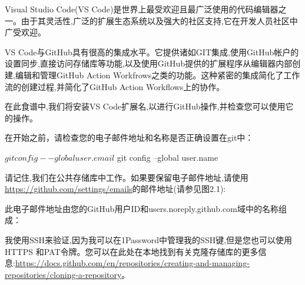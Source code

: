 
Visual Studio Code(VS Code)是世界上最受欢迎且最广泛使用的代码编辑器之一。由于其灵活性,广泛的扩展生态系统以及强大的社区支持,它在开发人员社区中广受欢迎。

VS Code与GitHub具有很高的集成水平。它提供诸如GIT集成,使用GitHub帐户的设置同步,直接访问存储库等功能,以及使用GitHub提供的扩展程序从编辑器内部创建,编辑和管理GitHub Action Workfrows之类的功能。这种紧密的集成简化了工作流的创建过程,并简化了GitHub Action Workflows上的协作。

在此食谱中,我们将安装VS Code扩展名,以进行GitHub操作,并检查您可以使用它的操作。


在开始之前，请检查您的电子邮件地址和名称是否正确设置在git中：

\begin{shell}
$ git config --global user.email
$ git config --global user.name
\end{shell}

请记住,我们在公共存储库中工作。如果要保留电子邮件地址,请使用\url{https://github.com/settings/emails}的邮件地址(请参见图2.1):


此电子邮件地址由您的GitHub用户ID和users.noreply.github.com域中的名称组成：



我使用SSH来验证,因为我可以在1Password中管理我的SSH键,但是您也可以使用HTTPS 和PAT令牌。您可以在此处在本地找到有关克隆存储库的更多信息:\url{https://docs.github.com/en/repositories/creating-and-managing-repositories/cloning-a-repository}。


